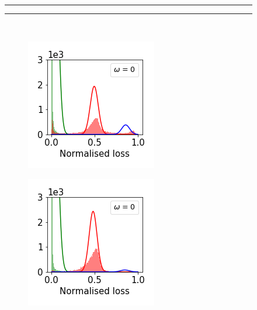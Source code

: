 \documentclass[11pt]{article}
\begin{document}
\begin{figure}[t]
  \centering
    \\
  \noindent  \rule{5cm}{0.5pt} \hspace{12mm} \rule{5cm}{0.5pt}
  \\
  
  \begin{subfigure}{.18\textwidth}
    \centering
    \includegraphics[width=\linewidth]{images/loss_dist/EDM_0.6_1.00_cifar100.png} 
  \end{subfigure}
  \begin{subfigure}{.18\textwidth}
    \centering
    \includegraphics[width=\linewidth]{images/loss_dist/EDM_0.6_1.00_imagenet32.png} 

\end{subfigure}
\end{figure}
\end{document}
